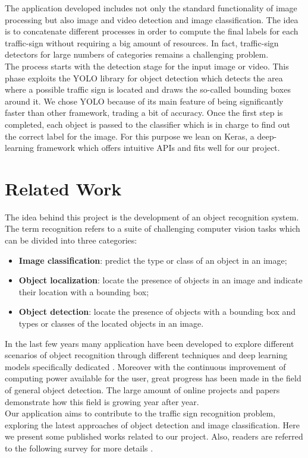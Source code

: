 \documentclass[10pt,twocolumn,letterpaper]{article}
\begin{document}
The application developed includes not only the standard functionality of image processing but also image and video detection and image classification. The idea is to concatenate different processes in order to compute the final labels for each traffic-sign without requiring a big amount of resources. In fact, traffic-sign detectors for large numbers of categories remains a challenging problem.\\ The process starts with the detection stage for the input image or video. This phase exploits the YOLO \cite{yolo} library for object detection which detects the area where a possible traffic sign is located and draws the so-called bounding boxes around it. We chose YOLO because of its main feature of being significantly faster than other framework, trading a bit of accuracy. Once the first step is completed, each object is passed to the classifier which is in charge to find out the correct label for the image. For this purpose we lean on Keras, a deep-learning framework which offers intuitive APIs and fits well for our project.  
\section{Related Work}
The idea behind this project is the development of an object recognition system. The term recognition refers to a suite of challenging computer vision tasks which can be divided into three categories:
\begin{itemize}[noitemsep,topsep=0pt]
	\item\textbf{Image classification}: predict the type or class of an object in an image;
	\item\textbf{Object localization}: locate the presence of objects in an image and indicate their location with a bounding box;
	\item\textbf{Object detection}: locate the presence of objects with a bounding box and types or classes of the located objects in an image.
\end{itemize}
In the last few years many application have been developed to explore different scenarios of object recognition through different techniques and deep learning models specifically dedicated \cite{wangMethods, tsrWithCnn, tsrWithCnn2}. Moreover with the continuous improvement of computing power available for the user, great progress has been made in the field of general object detection. The large amount of online projects and papers demonstrate how this field is growing year after year.\\
Our application aims to contribute to the traffic sign recognition problem, exploring the latest approaches of object detection and image classification. Here we present some published works related to our project. Also, readers are referred to the following survey for more details \cite{tsr20}.
\end{document}
